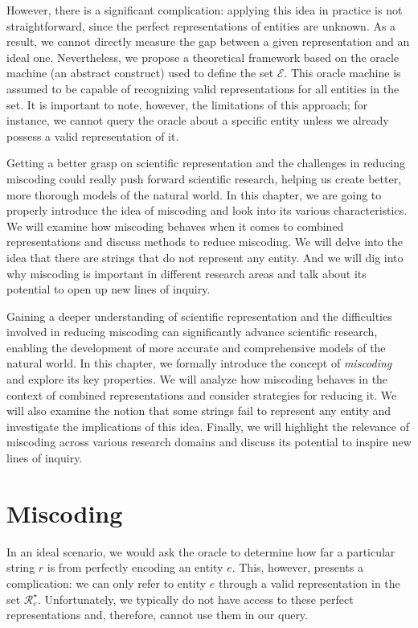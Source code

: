 However, there is a significant complication: applying this idea in practice is not straightforward, since the perfect representations of entities are unknown. As a result, we cannot directly measure the gap between a given representation and an ideal one. Nevertheless, we propose a theoretical framework based on the oracle machine (an abstract construct) used to define the set $\mathcal{E}$. This oracle machine is assumed to be capable of recognizing valid representations for all entities in the set. It is important to note, however, the limitations of this approach; for instance, we cannot query the oracle about a specific entity unless we already possess a valid representation of it.

Getting a better grasp on scientific representation and the challenges in reducing miscoding could really push forward scientific research, helping us create better, more thorough models of the natural world. In this chapter, we are going to properly introduce the idea of miscoding and look into its various characteristics. We will examine how miscoding behaves when it comes to combined representations and discuss methods to reduce miscoding. We will delve into the idea that there are strings that do not represent any entity. And we will dig into why miscoding is important in different research areas and talk about its potential to open up new lines of inquiry.

Gaining a deeper understanding of scientific representation and the difficulties involved in reducing miscoding can significantly advance scientific research, enabling the development of more accurate and comprehensive models of the natural world. In this chapter, we formally introduce the concept of \emph{miscoding} and explore its key properties. We will analyze how miscoding behaves in the context of combined representations and consider strategies for reducing it. We will also examine the notion that some strings fail to represent any entity and investigate the implications of this idea. Finally, we will highlight the relevance of miscoding across various research domains and discuss its potential to inspire new lines of inquiry.

%
%
\section{Miscoding}
\label{sec:miscoding}

In an ideal scenario, we would ask the oracle to determine how far a particular string $r$ is from perfectly encoding an entity $e$. This, however, presents a complication: we can only refer to entity $e$ through a valid representation in the set $\mathcal{R}^\star_e$. Unfortunately, we typically do not have access to these perfect representations and, therefore, cannot use them in our query.

